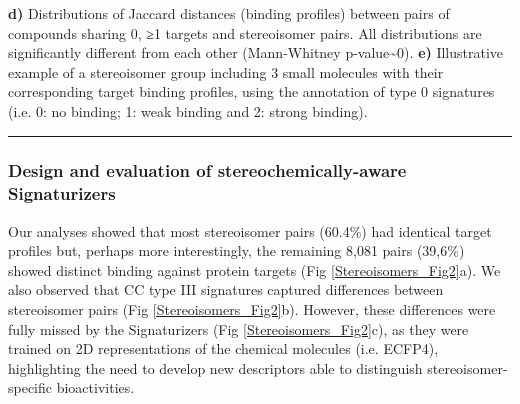 \begin{Figure_modified}
{    \textbf{d)} Distributions of Jaccard distances (binding profiles) between pairs of compounds sharing 0, ≥1 targets and stereoisomer pairs. All distributions are significantly different from each other (Mann-Whitney p-value\textasciitilde0).
    \textbf{e)} Illustrative example of a stereoisomer group including 3 small molecules with their corresponding target binding profiles, using the annotation of type 0 signatures (i.e. 0: no binding; 1: weak binding and 2: strong binding).
  }
  \vspace{-5mm}
  \rule[0ex]{\textwidth}{0.5pt}
  \vspace{-9mm}
  \label{Stereoisomers_Fig1}
\end{Figure_modified}



\subsubsection{Design and evaluation of stereochemically-aware Signaturizers}
\label{Stereoisomers_Design_Evaluation_Signaturizers}

Our analyses showed that most stereoisomer pairs (60.4\%) had identical target profiles but, perhaps more interestingly, the remaining 8,081 pairs (39,6\%) showed distinct binding against protein targets (Fig \ref{Stereoisomers_Fig2}a). We also observed that CC type III signatures captured differences between stereoisomer pairs (Fig \ref{Stereoisomers_Fig2}b). However, these differences were fully missed by the Signaturizers (Fig \ref{Stereoisomers_Fig2}c), as they were trained on 2D representations of the chemical molecules (i.e. ECFP4\cite{rogers_extended-connectivity_2010}), highlighting the need to develop new descriptors able to distinguish stereoisomer-specific bioactivities.

